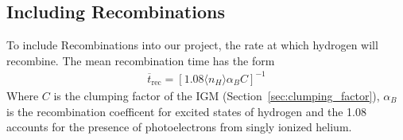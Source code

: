 
\subsection{Including Recombinations} %
\label{sub:including_recombinations}

	To include Recombinations into our project, the rate at which hydrogen will recombine. The mean recombination time\cite{2012ApJ...746..125H} has the form
	\begin{align}
		\overline{t}_\text{rec}= \left[1.08\langle n_{H}\rangle\alpha_{B}C \right]^{-1}
	\end{align}
	Where $C$ is the clumping factor of the IGM (Section~\ref{sec:clumping_factor}), $\alpha_{B}$ is the recombination coefficent for excited states of hydrogen and the 1.08 accounts for the presence of photoelectrons from singly ionized helium.

